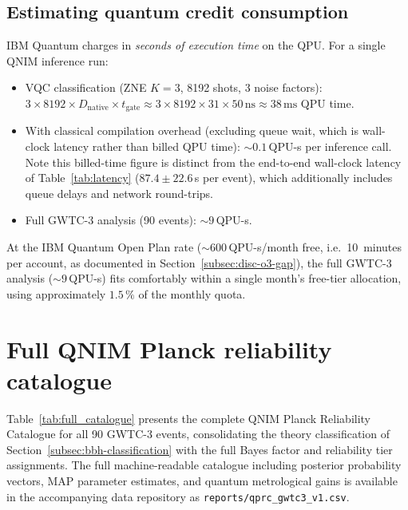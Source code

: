 \documentclass[11pt,a4paper, english]{book}
\theoremstyle{plain}
\theoremstyle{definition}
\numberwithin{equation}{chapter}
\numberwithin{figure}{chapter}
\numberwithin{table}{chapter}
\begin{document}
\section{Estimating quantum credit consumption}
\label{app:ibm-credits}

IBM Quantum charges in \emph{seconds of execution time} on the QPU.
For a single QNIM inference run:

\begin{itemize}
  \item VQC classification (ZNE $K=3$, 8192 shots, 3 noise factors):
        $3 \times 8192 \times D_\mathrm{native} \times t_\mathrm{gate}
        \approx 3 \times 8192 \times 31 \times 50\,\mathrm{ns}
        \approx 38\,\mathrm{ms}$ QPU time.
  \item With classical compilation overhead (excluding queue wait, which is
wall-clock latency rather than billed QPU time): $\sim\!0.1$\,QPU-s
per inference call. Note this billed-time figure is distinct from the
end-to-end wall-clock latency of Table~\ref{tab:latency}
($87.4\pm22.6$\,s per event), which additionally includes queue delays
and network round-trips.
  \item Full GWTC-3 analysis (90 events): $\sim\!9$\,QPU-s.
\end{itemize}

At the IBM Quantum Open Plan rate ($\sim$600\,QPU-s/month free, i.e.\
10~minutes per account, as documented in
Section~\ref{subsec:disc-o3-gap}), the full GWTC-3 analysis
(${\sim}9$\,QPU-s) fits comfortably within a single month's free-tier
allocation, using approximately $1.5\,\%$ of the monthly quota.

\chapter{Full QNIM Planck reliability catalogue}
\label{app:full-catalogue}

Table~\ref{tab:full_catalogue} presents the complete QNIM Planck
Reliability Catalogue for all 90 GWTC-3 events, consolidating the
theory classification of Section~\ref{subsec:bbh-classification} with
the full Bayes factor and reliability tier assignments. The full
machine-readable catalogue including posterior probability vectors,
MAP parameter estimates, and quantum metrological gains is available
in the accompanying data repository as
\texttt{reports/qprc\_gwtc3\_v1.csv}.
\end{document}
